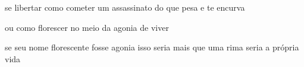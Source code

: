 \begin{poem}
\begin{stanza}
se libertar como\verseline
cometer um assassinato\verseline
\qquad \qquad do que pesa\verseline
\qquad \qquad e te encurva
\end{stanza}
\begin{stanza}
ou como\verseline
florescer no meio da agonia\verseline
de viver
\end{stanza}
\begin{stanza}
se seu nome\verseline
\qquad \qquad florescente\verseline
fosse agonia isso\verseline
seria mais que uma rima\verseline
seria a \verseline
própria vida
\end{stanza}
\end{poem}